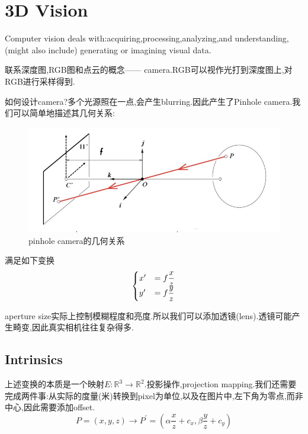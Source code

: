 \section{3D Vision}
Computer vision deals with:acquiring,processing,analyzing,and understanding,(might also include) generating or imagining visual data.

联系深度图,RGB图和点云的概念------ camera.RGB可以视作光打到深度图上,对RGB进行采样得到.

如何设计camera?多个光源照在一点,会产生blurring.因此产生了Pinhole camera.我们可以简单地描述其几何关系:
\begin{figure}[htbp]
	\centering
	\includegraphics[scale=0.65]{figures/pinholecamera.png}
	\caption{pinhole camera的几何关系}
	\label{}
\end{figure}

满足如下变换
\begin{equation}
	\begin{cases}
		x^\prime &= f\displaystyle\frac{x}{z}
		\\
		y^\prime &= f\displaystyle\frac{y}{z}
	\end{cases}
\end{equation}

aperture size实际上控制模糊程度和亮度.所以我们可以添加透镜(lens).透镜可能产生畸变,因此真实相机往往复杂得多.

\subsection{Intrinsics}
上述变换的本质是一个映射$E: \mathbb{R}^3 \to \mathbb R^2$.投影操作,projection mapping.我们还需要完成两件事:从实际的度量(米)转换到pixel为单位,以及在图片中,左下角为零点,而非中心,因此需要添加offset.
\begin{equation}
	P=(x, y, z) \rightarrow P^{\prime}=\left(\alpha \frac{x}{z}+c_{x}, \beta \frac{y}{z}+c_{y}\right)
\end{equation}

